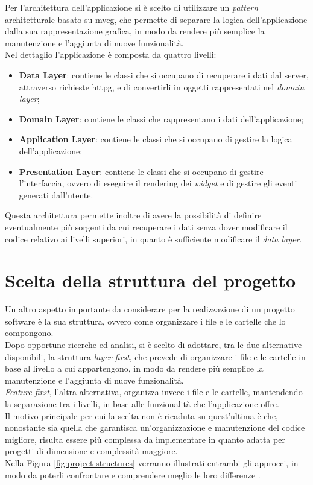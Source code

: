 Per l'architettura dell'applicazione si è scelto di utilizzare un \emph{pattern} architetturale basato su \gls{mvcg}\glsoccur \cite{site:app-architecture}, che permette di separare la logica dell'applicazione dalla sua rappresentazione grafica, in modo da rendere più semplice la manutenzione e l'aggiunta di nuove funzionalità.\\
Nel dettaglio l'applicazione è composta da quattro livelli:
\begin{itemize}
    \item \textbf{Data Layer}: contiene le classi che si occupano di recuperare i dati dal server, attraverso richieste \gls{httpg}\glsoccur, e di convertirli in oggetti rappresentati nel \emph{domain layer};
    \item \textbf{Domain Layer}: contiene le classi che rappresentano i dati dell'applicazione;
    \item \textbf{Application Layer}: contiene le classi che si occupano di gestire la logica dell'applicazione;
    \item \textbf{Presentation Layer}: contiene le classi che si occupano di gestire l'interfaccia, ovvero di eseguire il rendering dei \emph{widget} e di gestire gli eventi generati dall'utente.
\end{itemize}
Questa architettura permette inoltre di avere la possibilità di definire eventualmente più sorgenti da cui recuperare i dati senza dover modificare il codice relativo ai livelli superiori, in quanto è sufficiente modificare il \emph{data layer}.

\section{Scelta della struttura del progetto}
\label{sec:struttura-progetto}
Un altro aspetto importante da considerare per la realizzazione di un progetto software è la sua struttura, ovvero come organizzare i file e le cartelle che lo compongono.\\
Dopo opportune ricerche ed analisi, si è scelto di adottare, tra le due alternative disponibili, la struttura \emph{layer first}, che prevede di organizzare i file e le cartelle in base al livello a cui appartengono, in modo da rendere più semplice la manutenzione e l'aggiunta di nuove funzionalità.\\
\emph{Feature first}, l'altra alternativa, organizza invece i file e le cartelle, mantendendo la separazione tra i livelli, in base alle funzionalità che l'applicazione offre.\\
Il motivo principale per cui la scelta non è ricaduta su quest'ultima è che, nonostante sia quella che garantisca un'organizzazione e manutenzione del codice migliore, risulta essere più complessa da implementare in quanto adatta per progetti di dimensione e complessità maggiore.\\
Nella Figura \ref{fig:project-structures} verranno illustrati entrambi gli approcci, in modo da poterli confrontare e comprendere meglio le loro differenze \cite{site:project-structure}.

